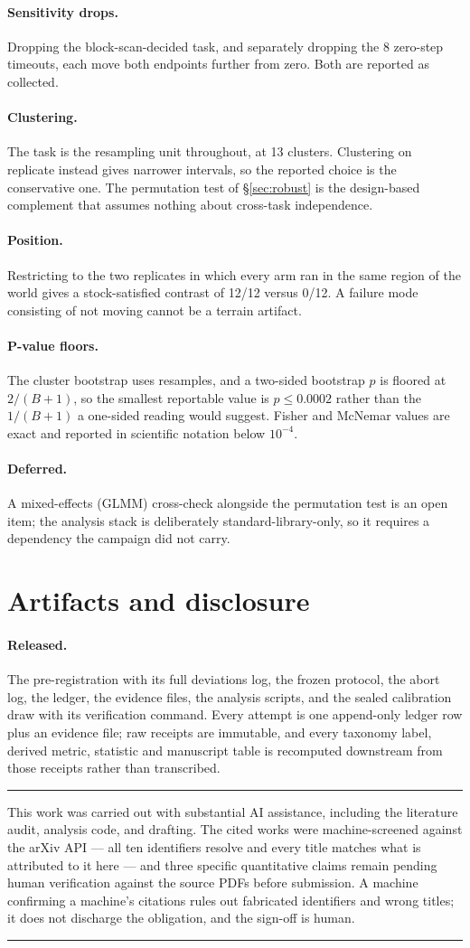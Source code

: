 \documentclass[11pt]{article}
\newcommand{\runin}[1]{\paragraph{#1}}
\newenvironment{callout}[1]
  {\par\medskip\noindent\rule{\linewidth}{0.9pt}\par\nobreak\smallskip
   \noindent{\footnotesize\textsc{#1}}\par\nobreak\smallskip\small}
  {\par\smallskip\noindent\rule{\linewidth}{0.4pt}\par\medskip}
\begin{document}
\runin{Sensitivity drops.}
Dropping the block-scan-decided task, and separately dropping the 8
zero-step timeouts, each move both endpoints further from zero. Both are
reported as collected.

\runin{Clustering.}
The task is the resampling unit throughout, at 13 clusters. Clustering
on replicate instead gives narrower intervals, so the reported choice is
the conservative one. The permutation test of \S\ref{sec:robust} is the
design-based complement that assumes nothing about cross-task
independence.

\runin{Position.}
Restricting to the two replicates in which every arm ran in the same
region of the world gives a stock-satisfied contrast of 12/12 versus
0/12. A failure mode consisting of not moving cannot be a terrain
artifact.

\runin{P-value floors.}
The cluster bootstrap uses \Resamples{} resamples, and a two-sided
bootstrap $p$ is floored at $2/(B+1)$, so the smallest reportable value
is $p \le 0.0002$ rather than the $1/(B+1)$ a one-sided reading would
suggest. Fisher and McNemar values are exact and reported in scientific
notation below $10^{-4}$.

\runin{Deferred.}
A mixed-effects (GLMM) cross-check alongside the permutation test is an
open item; the analysis stack is deliberately standard-library-only, so
it requires a dependency the campaign did not carry.

\section{Artifacts and disclosure}
\label{app:artifacts}

\runin{Released.}
The pre-registration with its full deviations log, the frozen protocol,
the abort log, the ledger, the evidence files, the analysis scripts, and
the sealed calibration draw with its verification command. Every attempt
is one append-only ledger row plus an evidence file; raw receipts are
immutable, and every taxonomy label, derived metric, statistic and
manuscript table is recomputed downstream from those receipts rather
than transcribed.

\begin{callout}{AI assistance}
This work was carried out with substantial AI assistance, including the
literature audit, analysis code, and drafting. The cited works were
machine-screened against the arXiv API --- all ten identifiers resolve
and every title matches what is attributed to it here --- and three
specific quantitative claims remain pending human verification against
the source PDFs before submission. A machine confirming a machine's
citations rules out fabricated identifiers and wrong titles; it does not
discharge the obligation, and the sign-off is human.
\end{callout}
\end{document}
